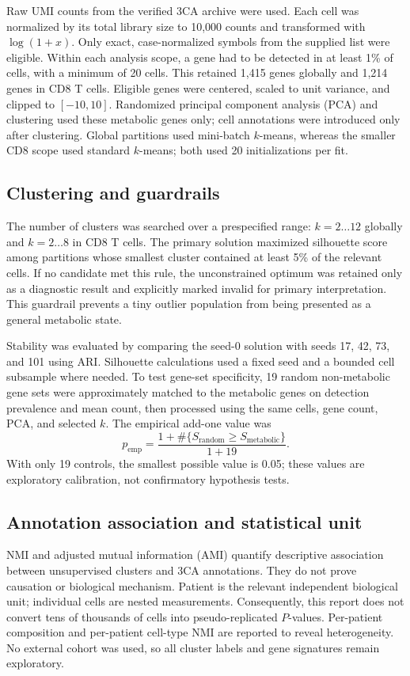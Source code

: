 \documentclass[11pt]{article}
\begin{document}
Raw UMI counts from the verified 3CA archive were used. Each cell was normalized by its total library size to 10,000 counts and transformed with $\log(1+x)$. Only exact, case-normalized symbols from the supplied list were eligible. Within each analysis scope, a gene had to be detected in at least 1\% of cells, with a minimum of 20 cells. This retained 1,415 genes globally and 1,214 genes in CD8 T cells. Eligible genes were centered, scaled to unit variance, and clipped to $[-10,10]$. Randomized principal component analysis (PCA) and clustering used these metabolic genes only; cell annotations were introduced only after clustering. Global partitions used mini-batch $k$-means, whereas the smaller CD8 scope used standard $k$-means; both used 20 initializations per fit.

\subsection{Clustering and guardrails}

The number of clusters was searched over a prespecified range: $k=2\ldots12$ globally and $k=2\ldots8$ in CD8 T cells. The primary solution maximized silhouette score among partitions whose smallest cluster contained at least 5\% of the relevant cells. If no candidate met this rule, the unconstrained optimum was retained only as a diagnostic result and explicitly marked invalid for primary interpretation. This guardrail prevents a tiny outlier population from being presented as a general metabolic state.

Stability was evaluated by comparing the seed-0 solution with seeds 17, 42, 73, and 101 using ARI. Silhouette calculations used a fixed seed and a bounded cell subsample where needed. To test gene-set specificity, 19 random non-metabolic gene sets were approximately matched to the metabolic genes on detection prevalence and mean count, then processed using the same cells, gene count, PCA, and selected $k$. The empirical add-one value was
\[
 p_{\mathrm{emp}}=\frac{1+\#\{S_{\mathrm{random}}\geq S_{\mathrm{metabolic}}\}}{1+19}.
\]
With only 19 controls, the smallest possible value is 0.05; these values are exploratory calibration, not confirmatory hypothesis tests.

\subsection{Annotation association and statistical unit}

NMI and adjusted mutual information (AMI) quantify descriptive association between unsupervised clusters and 3CA annotations. They do not prove causation or biological mechanism. Patient is the relevant independent biological unit; individual cells are nested measurements. Consequently, this report does not convert tens of thousands of cells into pseudo-replicated $P$-values. Per-patient composition and per-patient cell-type NMI are reported to reveal heterogeneity. No external cohort was used, so all cluster labels and gene signatures remain exploratory.
\end{document}
